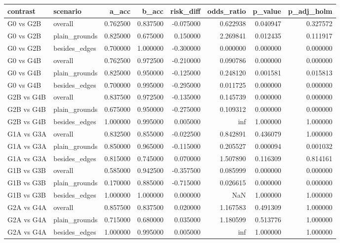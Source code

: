 \begin{tabular}{llrrrrrr}
\toprule
contrast & scenario & a_acc & b_acc & risk_diff & odds_ratio & p_value & p_adj_holm \\
\midrule
G0 vs G2B & overall & 0.762500 & 0.837500 & -0.075000 & 0.622938 & 0.040947 & 0.327572 \\
G0 vs G2B & plain_grounds & 0.825000 & 0.675000 & 0.150000 & 2.269841 & 0.012435 & 0.111917 \\
G0 vs G2B & besides_edges & 0.700000 & 1.000000 & -0.300000 & 0.000000 & 0.000000 & 0.000000 \\
G0 vs G4B & overall & 0.762500 & 0.972500 & -0.210000 & 0.090786 & 0.000000 & 0.000000 \\
G0 vs G4B & plain_grounds & 0.825000 & 0.950000 & -0.125000 & 0.248120 & 0.001581 & 0.015813 \\
G0 vs G4B & besides_edges & 0.700000 & 0.995000 & -0.295000 & 0.011725 & 0.000000 & 0.000000 \\
G2B vs G4B & overall & 0.837500 & 0.972500 & -0.135000 & 0.145739 & 0.000000 & 0.000000 \\
G2B vs G4B & plain_grounds & 0.675000 & 0.950000 & -0.275000 & 0.109312 & 0.000000 & 0.000000 \\
G2B vs G4B & besides_edges & 1.000000 & 0.995000 & 0.005000 & inf & 1.000000 & 1.000000 \\
G1A vs G3A & overall & 0.832500 & 0.855000 & -0.022500 & 0.842891 & 0.436079 & 1.000000 \\
G1A vs G3A & plain_grounds & 0.850000 & 0.965000 & -0.115000 & 0.205527 & 0.000094 & 0.001032 \\
G1A vs G3A & besides_edges & 0.815000 & 0.745000 & 0.070000 & 1.507890 & 0.116309 & 0.814161 \\
G1B vs G3B & overall & 0.585000 & 0.942500 & -0.357500 & 0.085999 & 0.000000 & 0.000000 \\
G1B vs G3B & plain_grounds & 0.170000 & 0.885000 & -0.715000 & 0.026615 & 0.000000 & 0.000000 \\
G1B vs G3B & besides_edges & 1.000000 & 1.000000 & 0.000000 & NaN & 1.000000 & 1.000000 \\
G2A vs G4A & overall & 0.857500 & 0.837500 & 0.020000 & 1.167583 & 0.491309 & 1.000000 \\
G2A vs G4A & plain_grounds & 0.715000 & 0.680000 & 0.035000 & 1.180599 & 0.513776 & 1.000000 \\
G2A vs G4A & besides_edges & 1.000000 & 0.995000 & 0.005000 & inf & 1.000000 & 1.000000 \\
\bottomrule
\end{tabular}
